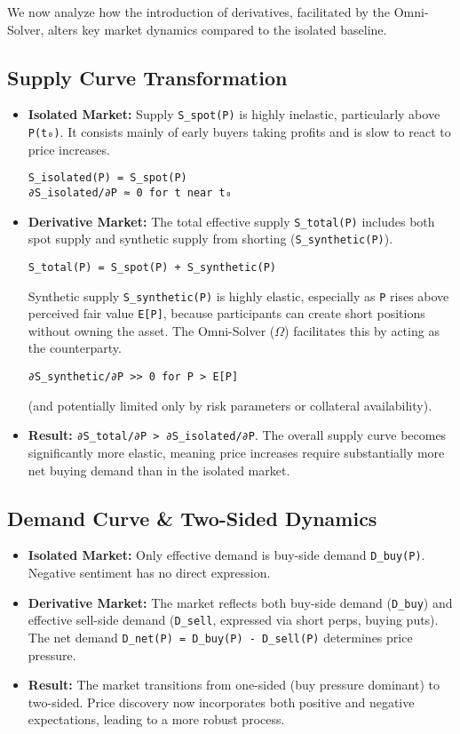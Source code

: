 \documentclass{article}
\begin{document}
We now analyze how the introduction of derivatives, facilitated by the Omni-Solver, alters key market dynamics compared to the isolated baseline.

\subsection{Supply Curve Transformation}
\begin{itemize}
    \item \textbf{Isolated Market:} Supply \lstinline{S_spot(P)} is highly inelastic, particularly above \lstinline{P(t₀)}. It consists mainly of early buyers taking profits and is slow to react to price increases.
    \begin{lstlisting}
S_isolated(P) = S_spot(P)
∂S_isolated/∂P ≈ 0 for t near t₀
    \end{lstlisting}
    \item \textbf{Derivative Market:} The total effective supply \lstinline{S_total(P)} includes both spot supply and synthetic supply from shorting (\lstinline{S_synthetic(P)}).
    \begin{lstlisting}
S_total(P) = S_spot(P) + S_synthetic(P)
    \end{lstlisting}
    Synthetic supply \lstinline{S_synthetic(P)} is highly elastic, especially as \lstinline{P} rises above perceived fair value \lstinline{E[P]}, because participants can create short positions without owning the asset. The Omni-Solver ($\Omega$) facilitates this by acting as the counterparty.
    \begin{lstlisting}
∂S_synthetic/∂P >> 0 for P > E[P]
    \end{lstlisting}
    (and potentially limited only by risk parameters or collateral availability).
    \item \textbf{Result:} \lstinline{∂S_total/∂P > ∂S_isolated/∂P}. The overall supply curve becomes significantly more elastic, meaning price increases require substantially more net buying demand than in the isolated market.
\end{itemize}

\subsection{Demand Curve & Two-Sided Dynamics}
\begin{itemize}
    \item \textbf{Isolated Market:} Only effective demand is buy-side demand \lstinline{D_buy(P)}. Negative sentiment has no direct expression.
    \item \textbf{Derivative Market:} The market reflects both buy-side demand (\lstinline{D_buy}) and effective sell-side demand (\lstinline{D_sell}, expressed via short perps, buying puts). The net demand \lstinline{D_net(P) = D_buy(P) - D_sell(P)} determines price pressure.
    \item \textbf{Result:} The market transitions from one-sided (buy pressure dominant) to two-sided. Price discovery now incorporates both positive and negative expectations, leading to a more robust process.
\end{itemize}
\end{document}
